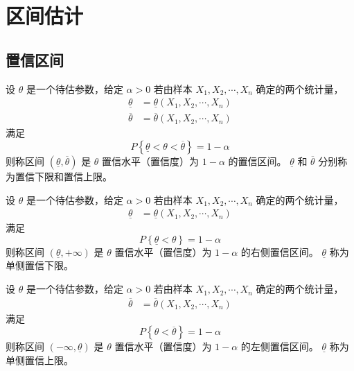 \section{区间估计}

\subsection{置信区间}


 设 $ \theta $ 是一个待估参数，给定 $ \alpha > 0 $ 若由样本 $ X_1, X_2, \cdots, X_n $ 确定的两个统计量，
\begin{align*}
    \underline{\theta} & = \underline{\theta}(X_1, X_2, \cdots, X_n) \\
    \overline{\theta} & = \overline{\theta}(X_1, X_2, \cdots, X_n)
\end{align*}
满足
\begin{equation}
    P\left\{ \underline{\theta} < \theta < \overline{\theta} \right\} = 1 - \alpha
\end{equation}
则称区间 $ \left(\underline{\theta}, \overline{\theta}\right) $ 是 $ \theta $ 置信水平（置信度）为 $ 1 - \alpha $ 的置信区间。
$ \underline{\theta} $ 和 $ \overline{\theta} $ 分别称为置信下限和置信上限。

 设 $ \theta $ 是一个待估参数，给定 $ \alpha > 0 $ 若由样本 $ X_1, X_2, \cdots, X_n $ 确定的两个统计量，
\begin{align*}
    \underline{\theta} & = \underline{\theta}(X_1, X_2, \cdots, X_n)
\end{align*}
满足
\begin{equation}
    P\left\{ \underline{\theta} < \theta \right\} = 1 - \alpha
\end{equation}
则称区间 $ \left(\underline{\theta}, +\infty\right) $ 是 $ \theta $ 置信水平（置信度）为 $ 1 - \alpha $ 的右侧置信区间。
$ \underline{\theta}$ 称为单侧置信下限。

 设 $ \theta $ 是一个待估参数，给定 $ \alpha > 0 $ 若由样本 $ X_1, X_2, \cdots, X_n $ 确定的两个统计量，
\begin{align*}
    \overline{\theta} & = \overline{\theta}(X_1, X_2, \cdots, X_n)
\end{align*}
满足
\begin{equation}
    P\left\{ \theta < \overline{\theta} \right\} = 1 - \alpha
\end{equation}
则称区间 $ \left(-\infty, \underline{\theta}\right) $ 是 $ \theta $ 置信水平（置信度）为 $ 1 - \alpha $ 的左侧置信区间。
$ \underline{\theta}$ 称为单侧置信上限。


